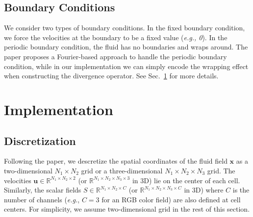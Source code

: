 \documentclass[sigconf]{acmart}
\begin{document}
\subsection{Boundary Conditions}
We consider two types of boundary conditions. In the fixed boundary condition, we force the velocities at the boundary to be a fixed value (\emph{e.g., 0}). In the periodic boundary condition, the fluid has no boundaries and wraps around. The paper proposes a Fourier-based approach to handle the periodic boundary condition, while in our implementation we can simply encode the wrapping effect when constructing the divergence operator. See Sec.~\ref{sec:impl} for more details.

\section{Implementation}
\label{sec:impl}
\subsection{Discretization}


Following the paper, we descretize the spatial coordinates of the fluid field $\mathbf{x}$ as a two-dimensional $N_1\times N_2$ grid or a three-dimensional $N_1\times N_2 \times N_3$ grid. The velocities $\mathbf{u} \in \mathbb{R}^{N_1\times N_2 \times 2}$ (or $\mathbb{R}^{N_1\times N_2 \times N_3 \times 3}$ in 3D) lie on the center of each cell. Similarly, the scalar fields $S \in \mathbb{R}^{N_1\times N_2 \times C}$ (or $\mathbb{R}^{N_1\times N_2 \times N_3 \times C}$ in 3D) where $C$ is the number of channels (\emph{e.g.}, $C = 3$ for an RGB color field) are also defined at cell centers. For simplicity, we assume two-dimensional grid in the rest of this section.
\end{document}
